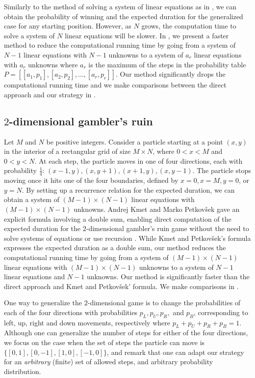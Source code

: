\documentclass[reqno]{amsart}
\theoremstyle{definition}
\theoremstyle{definition}
\theoremstyle{remark}
\begin{document}
Similarly to the method of solving a system of linear equations as in , we can obtain the probability of winning and the expected duration for the generalized case for any starting position. However, as $N$ grows, the computation time to solve a system of $N$ linear equations will be slower. In , we present a faster method to reduce the computational running time by going from a system of $N-1$ linear equations with $N-1$ unknowns to a system of $a_r$ linear equations with $a_r$ unknowns where $a_r$ is the maximum of the steps in the probability table $P=[[a_1,p_1], [a_2,p_2],\ldots , [a_r,p_r]]$. Our method significantly drops the computational running time and we make comparisons between the direct approach and our strategy in .


\subsection{$2$-dimensional gambler's ruin}\label{subsec:2 dim}
Let $M$ and $N$ be positive integers. Consider a particle starting at a point $(x,y)$ in the interior of a rectangular grid of size $M\times N$, where $0<x<M$ and $0<y<N$. At each step, the particle moves in one of four directions, each with probability $\frac{1}{4}$: $(x-1,y), (x,y+1), (x+1,y),(x,y-1)$. The particle stops moving once it hits one of the four boundaries, defined by $x=0, x=M, y=0$, or $y=N$. 
By setting up a recurrence relation for the  expected duration, we can obtain a system of $(M-1)\times(N-1)$ linear equations with $(M-1)\times(N-1)$ unknowns. Andrej Kmet and Marko Petkov\v{s}ek gave an explicit formula involving a double sum, enabling direct computation of the expected duration for the $2$-dimensional gambler's ruin game without the need to solve systems of equations or use recursion \cite{Kmet}. While Kmet and Petkov\v{s}ek's formula expresses the expected duration as a double sum, our method reduces the computational running time by going from a system of $(M-1)\times(N-1)$ linear equations with $(M-1)\times(N-1)$ unknowns to a system of $N-1$ linear equations and $N-1$ unknowns. Our method is significantly faster than the direct approach and Kmet and Petkov\v{s}ek' formula. We make comparisons in .


One way to generalize the $2$-dimensional game is to change the probabilities of each of the four directions with probabilities $p_L, p_U, p_R,$ and $p_B$, corresponding to left, up, right and down movements, respectively where $p_L+p_U+p_R+p_B=1$. Although one can generalize the number of steps for either of the four directions, we focus on the case when the set of steps the particle can
move is $\{[0,1],[0,-1],[1,0],[-1,0]\}$,
 and remark that one can adapt our strategy for an {\it arbitrary} (finite) set of allowed steps, and arbitrary probability distribution.
\end{document}
